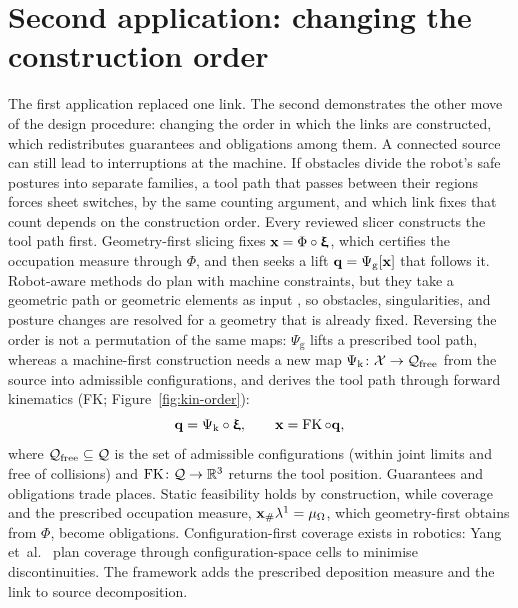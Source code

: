 \section{Second application: changing the construction order}
\label{main:next}

The first application replaced one link. The second demonstrates the other move of the design procedure: changing the order in which the links are constructed, which redistributes guarantees and obligations among them. A connected source can still lead to interruptions at the machine. If obstacles divide the robot's safe postures into separate families, a tool path that passes between their regions forces sheet switches, by the same counting argument, and which link fixes that count depends on the construction order. Every reviewed slicer constructs the tool path first. Geometry-first slicing fixes ${\bm{\mathrm{x}}}=\Phi\circ{\bm{\mathrm{\upxi}}}$, which certifies the occupation measure through $\Phi$, and then seeks a lift ${\bm{\mathrm{q}}}=\Psi_{\mathrm{g}}[{\bm{\mathrm{x}}}]$ that follows it. Robot-aware methods do plan with machine constraints, but they take a geometric path or geometric elements as input \cite{chalvin2020layer,schmitz2021robot,zhang2021singularity,huang2018choreo}, so obstacles, singularities, and posture changes are resolved for a geometry that is already fixed. Reversing the order is not a permutation of the same maps: $\Psi_{\mathrm{g}}$ lifts a prescribed tool path, whereas a machine-first construction needs a new map $\Psi_{\mathrm{k}}\colon\mathcal{X}\to\mathcal{Q}_{\mathrm{free}}$ from the source into admissible configurations, and derives the tool path through forward kinematics (FK; Figure~\ref{fig:kin-order}):
\begin{equation}
  \label{eq:kinematicsfirst}
  {\bm{\mathrm{q}}}=\Psi_{\mathrm{k}}\circ{\bm{\mathrm{\upxi}}},\qquad {\bm{\mathrm{x}}}=\operatorname{FK}\circ {\bm{\mathrm{q}}},
\end{equation}
where $\mathcal{Q}_{\mathrm{free}}\subseteq\mathcal{Q}$ is the set of admissible configurations (within joint limits and free of collisions) and $\operatorname{FK}\colon\mathcal{Q}\to\mathbb R^3$ returns the tool position. Guarantees and obligations trade places. Static feasibility holds by construction, while coverage and the prescribed occupation measure, ${\bm{\mathrm{x}}}_\#\lambda^1=\mu_\Omega$, which geometry-first obtains from $\Phi$, become obligations. Configuration-first coverage exists in robotics: Yang et~al.\ \cite{yang2020coverage} plan coverage through configuration-space cells to minimise discontinuities. The framework adds the prescribed deposition measure and the link to source decomposition.

